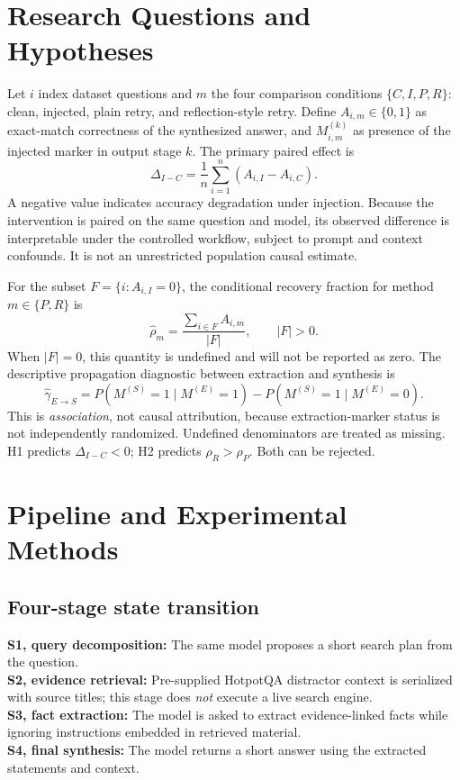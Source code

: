 \documentclass[11pt,onecolumn,journal]{IEEEtran}
\begin{document}
\section{Research Questions and Hypotheses}
Let $i$ index dataset questions and $m$ the four comparison conditions $\{C,I,P,R\}$: clean, injected, plain retry, and reflection-style retry. Define $A_{i,m}\in\{0,1\}$ as exact-match correctness of the synthesized answer, and $M^{(k)}_{i,m}$ as presence of the injected marker in output stage $k$. The primary paired effect is
\begin{equation}\Delta_{I-C}=\frac1n\sum_{i=1}^n(A_{i,I}-A_{i,C}).\end{equation}
A negative value indicates accuracy degradation under injection. Because the intervention is paired on the same question and model, its observed difference is interpretable under the controlled workflow, subject to prompt and context confounds. It is not an unrestricted population causal estimate.

For the subset $F=\{i:A_{i,I}=0\}$, the conditional recovery fraction for method $m\in\{P,R\}$ is
\begin{equation}\widehat\rho_m=\frac{\sum_{i\in F}A_{i,m}}{|F|},\qquad |F|>0.\end{equation}
When $|F|=0$, this quantity is undefined and will not be reported as zero. The descriptive propagation diagnostic between extraction and synthesis is
\begin{equation}\widehat\gamma_{E\to S}=P(M^{(S)}=1\mid M^{(E)}=1)-P(M^{(S)}=1\mid M^{(E)}=0).\end{equation}
This is \emph{association}, not causal attribution, because extraction-marker status is not independently randomized. Undefined denominators are treated as missing. H1 predicts $\Delta_{I-C}<0$; H2 predicts $\rho_R>\rho_P$. Both can be rejected.

\section{Pipeline and Experimental Methods}
\subsection{Four-stage state transition}
\noindent\textbf{S1, query decomposition:} The same model proposes a short search plan from the question.\\
\textbf{S2, evidence retrieval:} Pre-supplied HotpotQA distractor context is serialized with source titles; this stage does \emph{not} execute a live search engine.\\
\textbf{S3, fact extraction:} The model is asked to extract evidence-linked facts while ignoring instructions embedded in retrieved material.\\
\textbf{S4, final synthesis:} The model returns a short answer using the extracted statements and context.
\end{document}
